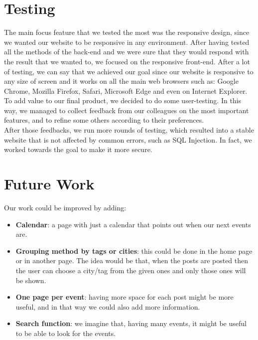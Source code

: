 \documentclass[a4paper]{article}
\begin{document}
	\section{Testing}
	The main focus feature that we tested the most was the responsive design, since we wanted our website to be responsive in any environment. After having tested all the methods of the back-end and we were sure that they would respond with the result that we wanted to, we focused on the responsive front-end. After a lot of testing, we can say that we achieved our goal since our website is responsive to any size of screen and it works on all the main web browsers such as: Google Chrome, Mozilla Firefox, Safari, Microsoft Edge and even on Internet Explorer.\\
	To add value to our final product, we decided to do some user-testing. In this way, we managed to collect feedback from our colleagues on the most important features, and to refine some others according to their preferences.\\
	After those feedbacks, we run more rounds of testing, which resulted into a stable website that is not affected by common errors, such as SQL Injection. In fact, we worked towards the goal to make it more secure.\\
	
	\section{Future Work}
	Our work could be improved by adding:
	\begin{itemize}
		\item \textbf{Calendar}: a page with just a calendar that points out when our next events are.
		\item \textbf{Grouping method by tags or cities}: this could be done in the home page or in another page. The idea would be that, when the posts are posted then the user can choose a city/tag from the given ones and only those ones will be shown.
		\item \textbf{One page per event}: having more space for each post might be more useful, and in that way we could also add more information.
		\item \textbf{Search function}: we imagine that, having many events, it might be useful to be able to look for the events.
	\end{itemize}
	
\end{document}
